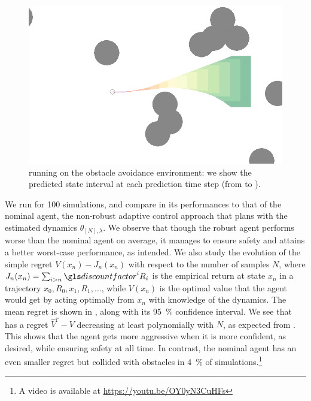 \begin{figure}[ht]
	\centering
	\includegraphics[width=0.7\linewidth]{img/obstacle_small}
	\caption{ running on the obstacle avoidance environment: we show the predicted state interval at each prediction time step (from  to ).}
	\label{fig:obstacle-env}
\end{figure}

We run  for 100 simulations, and compare in  its performances to that of the nominal agent, \ie the non-robust adaptive control approach that plans with the estimated dynamics $\theta_{[N],\lambda}$. We observe that though the robust agent performs worse than the nominal agent on average, it manages to ensure safety and attains a better worst-case performance, as intended. We also study the evolution of the simple regret $V(x_n) - J_n(x_n)$ with respect to the number of samples $N$, where $J_n(x_n) = \sum_{i > n} \discount^i R_i$ is the empirical return at state $x_n$ in a trajectory $x_0, R_0, x_1, R_1, \dots$, while $V(x_n)$ is the optimal value that the agent would get by acting optimally from $x_n$ with knowledge of the dynamics. The mean regret is shown in , along with its \SI{95}{\percent} confidence interval. We see that  has a regret $\hat{V}^r - V$ decreasing at least polynomially with $N$, as expected from . This shows that the agent gets more aggressive when it is more confident, as desired, while ensuring safety at all time. In contrast, the nominal agent has an even smaller regret but collided with obstacles in \SI{4}{\percent} of simulations.\footnote{A video is available at \href{https://youtu.be/OY0yN3CuHFs}{https://youtu.be/OY0yN3CuHFs}}

